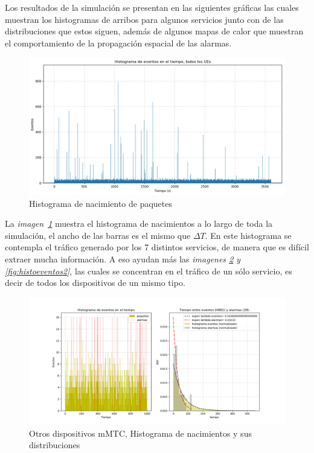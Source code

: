 Los resultados de la simulación se presentan en las siguientes gráficas las cuales muestran los histogramas de arribos para algunos servicios junto con de las distribuciones que estos siguen, además de algunos mapas de calor que muestran el comportamiento de la propagación espacial de las alarmas. \newline

\begin{figure}[th]
    \centering
    \includegraphics[scale=.55]{Figures/histoeventos.png}
    \decoRule
    \caption[Histograma de nacimientos de paquetes]{Histograma de nacimiento de paquetes}
    \label{fig:histoeventos}
\end{figure}

La \textit{imagen~\ref{fig:histoeventos}} muestra el histograma de nacimientos a lo largo de toda la simulación, el ancho de las barras es el mismo que $\Delta T$. En este histograma se contempla el tráfico generado por los 7 distintos servicios, de manera que es difícil extraer mucha información. A eso ayudan más las \textit{imagenes \ref{fig:histoeventos1} y \ref{fig:histoeventos2}}, las cuales se concentran en el tráfico de un sólo servicio, es decir de todos los dispositivos de un mismo tipo.\newline

\begin{figure}[th]
    \centering
    \includegraphics[scale=.55]{Figures/Otros_dispositivos_mMTC.png}
    \decoRule
    \caption[Otros dispositivos mMTC, Histograma de nacimientos y sus distribuciones]{Otros dispositivos mMTC, Histograma de nacimientos y sus distribuciones}
    \label{fig:histoeventos1}
\end{figure}

